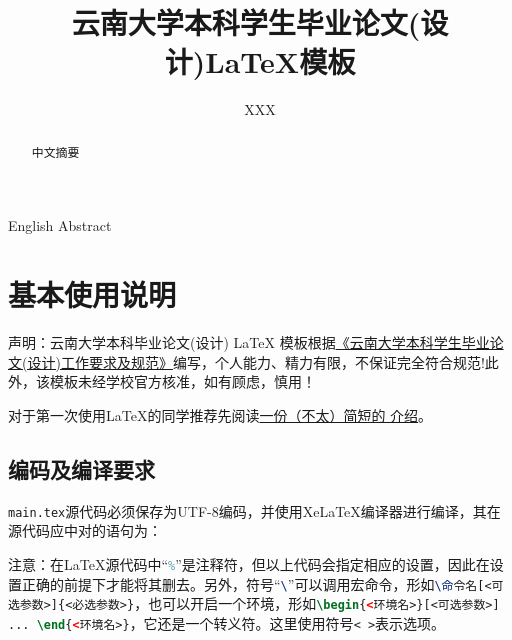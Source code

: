 \documentclass{YNUbachelor}
\title{云南大学本科学生毕业论文(设计)\;\LaTeX 模板}
\author{XXX}
\begin{document}
	
	\cover
	
	\copyrightpage
	
	\maketitle

	\toc

	\begin{abstract}
		中文摘要
	\end{abstract}


	\begin{enabstract}
		English Abstract
	\end{enabstract}

		
	\section{基本使用说明}
		声明：云南大学本科毕业论文(设计) LaTeX 模板根据\href{http://www.jwc.ynu.edu.cn/info/1003/2052.htm}{《云南大学本科学生毕业论文(设计)工作要求及规范》}编写，个人能力、精力有限，不保证完全符合规范!此外，该模板未经学校官方核准，如有顾虑，慎用！
		
		对于第一次使用\LaTeX 的同学推荐先阅读\href{http://mirrors.ctan.org/info/lshort/chinese/lshort-zh-cn.pdf}{一份（不太）简短的 \LaTeXe 介绍}。
		
		\subsection{编码及编译要求}
		\lstinline[language=latex]|main.tex|源代码必须保存为UTF-8编码，并使用XeLaTeX编译器进行编译，其在源代码应中对的语句为：
		
	\begin{latexcode}
	\end{latexcode}
		
		注意：在\LaTeX 源代码中``\lstinline[language=latex]|%|''是注释符，但以上代码会指定相应的设置，因此在设置正确的前提下才能将其删去。另外，符号``\lstinline[language=latex]|\|''可以调用宏命令，形如\lstinline[language=latex]|\命令名[<可选参数>]{<必选参数>}|，也可以开启一个环境，形如\lstinline[language=latex]|\begin{<环境名>}[<可选参数>] ... \end{<环境名>}|，它还是一个转义符。这里使用符号\lstinline[language=latex]|< >|表示选项。
		
\end{document}
